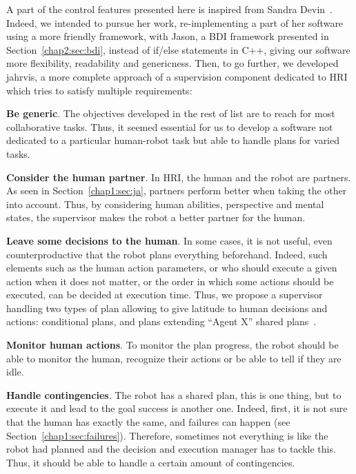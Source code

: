 \documentclass[a4paper,11pt,twoside]{StyleThese}
\begin{document}
A part of the control features presented here is inspired from Sandra Devin~\cite{devin_2017_decisional}. Indeed, we intended to pursue her work, re-implementing a part of her software using a more friendly framework, \ie with Jason, a BDI framework presented in Section~\ref{chap2:sec:bdi}, instead of if/else statements in C++, giving our software more flexibility, readability and genericness.
Then, to go further, we developed \acrshort{jahrvis}, a more complete approach of a supervision component dedicated to HRI which tries to satisfy multiple requirements:

\begin{bulletList}
	\item \textbf{Be generic}. The objectives developed in the rest of list are to reach for most collaborative tasks. Thus, it seemed essential for us to develop a software not dedicated to a particular human-robot task but able to handle plans for varied tasks. 
	\item \textbf{Consider the human partner}. In HRI, the human and the robot are partners. As seen in Section~\ref{chap1:sec:ja}, partners perform better when taking the other into account. Thus, by considering human abilities, perspective and mental states, the supervisor makes the robot a better partner for the human.
	\item \textbf{Leave some decisions to the human}. In some cases, it is not useful, even counterproductive that the robot plans everything beforehand. Indeed, such elements such as the human action parameters, or who should execute a given action when it does not matter, or the order in which some actions should be executed, can be decided at execution time. Thus, we propose a supervisor handling two types of plan allowing to give latitude to human decisions and actions: conditional plans, and plans extending ``Agent X'' shared plans~\cite{devin_2017_decisions}.
	\item \textbf{Monitor human actions}. To monitor the plan progress, the robot should be able to monitor the human, \ie recognize their actions or be able to tell if they are idle.
	\item \textbf{Handle contingencies}. The robot has a shared plan, this is one thing, but to execute it and lead to the goal success is another one. Indeed, first, it is not sure that the human has exactly the same, and failures can happen (see Section~\ref{chap1:sec:failures}). Therefore, sometimes not everything is like the robot had planned and the decision and execution manager has to tackle this. Thus, it should be able to handle a certain amount of contingencies.

\end{bulletList}
\end{document}
